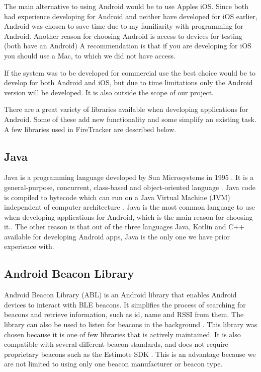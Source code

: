 \documentclass[../Main/thesis.tex]{subfiles}
\begin{document}
The main alternative to using Android would be to use Apples iOS.
Since both had experience developing for Android and neither have developed for iOS earlier, Android was chosen to save time due to my familiarity with programming for Android.
Another reason for choosing Android is access to devices for testing (both have an Android)
A recommendation is that if you are developing for iOS you should use a Mac, to which we did not have access.

If the system was to be developed for commercial use the best choice would be to develop for both Android and iOS, but due to time limitations only the Android version will be developed. 
It is also outside the scope of our project.

There are a great variety of libraries available when developing applications for Android.
Some of these add new functionality and some simplify an existing task.
A few libraries used in FireTracker are described below. 

\subsection{Java}
Java is a programming language developed by Sun Microsystems in 1995 \citep{SunMicrosystems1996}. 
It is a general-purpose, concurrent, class-based and object-oriented language \citep[p. 1]{Gosling2018}.
Java code is compiled to bytecode which can run on a Java Virtual Machine (JVM) independent of computer architecture \citep{Venners2000}. 
Java is the most common language to use when developing applications for Android, which is the main reason for choosing it..
The other reason is that out of the three languages Java, Kotlin and C++ \citep{Google2018b} available for developing Android apps, Java is the only one we have prior experience with.


\subsection{Android Beacon Library}
Android Beacon Library (ABL) is an Android library that enables Android devices to interact with BLE beacons. 
It simplifies the process of searching for beacons and retrieve information, such as id, name and RSSI from them.
The library can also be used to listen for beacons in the background \citep{RadiusNetwork2015}.
This library was chosen because it is one of few libraries that is actively maintained.
It is also compatible with several different beacon-standards, and does not require proprietary beacons such as the Estimote SDK \citep{Estimote2017}.
This is an advantage because we are not limited to using only one beacon manufacturer or beacon type.
\end{document}
